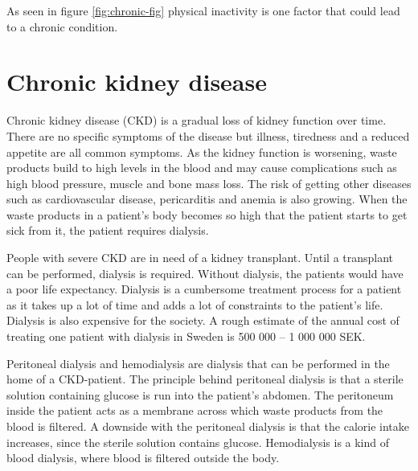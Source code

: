 \documentclass{cslthse-msc}
\begin{document}
As seen in figure \ref{fig:chronic-fig} physical inactivity is one factor that could lead to a chronic condition. 



\section{Chronic kidney disease}
\label{sec:kiney}

Chronic kidney disease (CKD) is a gradual loss of kidney function over time\cite{KIDNEYFOUNDATION}. There are no specific symptoms of the disease but illness, tiredness and a reduced appetite are all common symptoms. As the kidney function is worsening, waste products build to high levels in the blood and may cause complications such as high blood pressure,  muscle and bone mass loss. The risk of getting other diseases such as cardiovascular disease, pericarditis and anemia is also growing.  When the waste products in a patient’s body becomes so high that the patient starts to get sick from it, the patient requires dialysis\cite{KIDNEYFOUNDATION}.%

People with severe CKD are in need of a kidney transplant. Until a transplant can be performed, dialysis is required. Without dialysis, the patients would have a poor life expectancy\cite{KIDNEYFOUNDATION}. Dialysis is a cumbersome treatment process for a patient as it takes up a lot of time and adds a lot of constraints to the patient’s life. Dialysis is also expensive for the society. A rough estimate of the annual cost of treating one patient with dialysis in Sweden is 500 000 – 1 000 000 SEK. 

Peritoneal dialysis and hemodialysis are dialysis that can be performed in the home of a CKD-patient. The principle behind peritoneal dialysis is that a sterile solution containing glucose is run into the patient’s abdomen\cite{DIALYSIS}. The peritoneum inside the patient acts as a membrane across which waste products from the blood is filtered. A downside with the peritoneal dialysis is that the calorie intake increases, since the sterile solution contains glucose. Hemodialysis is a kind of blood dialysis, where blood is filtered outside the body.
\end{document}
